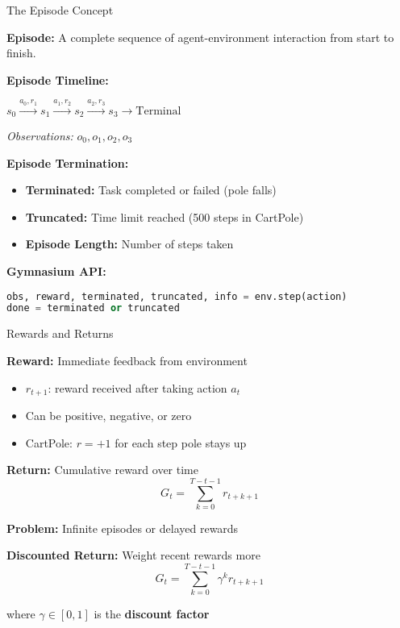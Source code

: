 \documentclass[aspectratio=169,10pt]{beamer}
\begin{document}
\begin{frame}[fragile]{The Episode Concept}

\textbf{Episode:} A complete sequence of agent-environment interaction from start to finish.

\vfill

\begin{center}
\textbf{Episode Timeline:}

$s_0 \xrightarrow{a_0, r_1} s_1 \xrightarrow{a_1, r_2} s_2 \xrightarrow{a_2, r_3} s_3 \rightarrow \text{Terminal}$

\vspace{0.5cm}
\textit{Observations:} $o_0, o_1, o_2, o_3$
\end{center}

\vfill

\textbf{Episode Termination:}
\begin{itemize}
    \item \textbf{Terminated:} Task completed or failed (pole falls)
    \item \textbf{Truncated:} Time limit reached (500 steps in CartPole)
    \item \textbf{Episode Length:} Number of steps taken
\end{itemize}

\vfill

\textbf{Gymnasium API:}
\begin{lstlisting}[language=Python]
obs, reward, terminated, truncated, info = env.step(action)
done = terminated or truncated
\end{lstlisting}

\end{frame}

\begin{frame}{Rewards and Returns}

\textbf{Reward:} Immediate feedback from environment
\begin{itemize}
    \item $r_{t+1}$: reward received after taking action $a_t$
    \item Can be positive, negative, or zero
    \item CartPole: $r = +1$ for each step pole stays up
\end{itemize}

\vfill

\textbf{Return:} Cumulative reward over time
$$G_t = \sum_{k=0}^{T-t-1} r_{t+k+1}$$

\textbf{Problem:} Infinite episodes or delayed rewards

\vfill

\textbf{Discounted Return:} Weight recent rewards more
$$G_t = \sum_{k=0}^{T-t-1} \gamma^k r_{t+k+1}$$

where $\gamma \in [0,1]$ is the \textbf{discount factor}

\end{frame}
\end{document}
